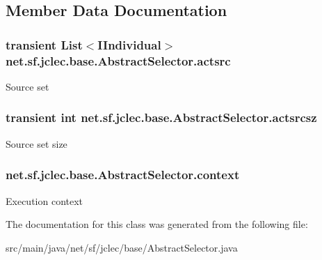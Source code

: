 \subsection{Member Data Documentation}
\hypertarget{classnet_1_1sf_1_1jclec_1_1base_1_1_abstract_selector_abb353bff6e96b278329dff246d5648e4}{
\subsubsection[{actsrc}]{\setlength{\rightskip}{0pt plus 5cm}transient List$<${\bf I\-Individual}$>$ net.\-sf.\-jclec.\-base.\-Abstract\-Selector.\-actsrc\hspace{0.3cm}{\ttfamily [protected]}}}\label{classnet_1_1sf_1_1jclec_1_1base_1_1_abstract_selector_abb353bff6e96b278329dff246d5648e4}
Source set \hypertarget{classnet_1_1sf_1_1jclec_1_1base_1_1_abstract_selector_ad405a34fb8182ec982b759fb0f6f8b2b}{
\subsubsection[{actsrcsz}]{\setlength{\rightskip}{0pt plus 5cm}transient int net.\-sf.\-jclec.\-base.\-Abstract\-Selector.\-actsrcsz\hspace{0.3cm}{\ttfamily [protected]}}}\label{classnet_1_1sf_1_1jclec_1_1base_1_1_abstract_selector_ad405a34fb8182ec982b759fb0f6f8b2b}
Source set size \hypertarget{classnet_1_1sf_1_1jclec_1_1base_1_1_abstract_selector_a4304fe5c27aa7631dc91678d22473b94}{
\subsubsection[{context}]{ net.\-sf.\-jclec.\-base.\-Abstract\-Selector.\-context\hspace{0.3cm}{\ttfamily [protected]}}}\label{classnet_1_1sf_1_1jclec_1_1base_1_1_abstract_selector_a4304fe5c27aa7631dc91678d22473b94}
Execution context 

The documentation for this class was generated from the following file\-:\begin{DoxyCompactItemize}
\item 
src/main/java/net/sf/jclec/base/Abstract\-Selector.\-java\end{DoxyCompactItemize}
